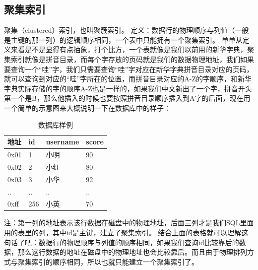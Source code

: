 \documentclass[UTF8]{ctexart}
\begin{document}
\subsection{聚集索引}
聚集（clustered）索引，也叫聚簇索引。
定义：数据行的物理顺序与列值（一般是主键的那一列）的逻辑顺序相同，一个表中只能拥有一个聚集索引。
单单从定义来看是不是显得有点抽象，打个比方，一个表就像是我们以前用的新华字典，聚集索引就像是拼音目录，而每个字存放的页码就是我们的数据物理地址，我们如果要查询一个“哇”字，我们只需要查询“哇”字对应在新华字典拼音目录对应的页码，就可以查询到对应的“哇”字所在的位置，而拼音目录对应的A-Z的字顺序，和新华字典实际存储的字的顺序A-Z也是一样的，如果我们中文新出了一个字，拼音开头第一个是B，那么他插入的时候也要按照拼音目录顺序插入到A字的后面，现在用一个简单的示意图来大概说明一下在数据库中的样子：
\begin{table}[]
    \caption{数据库样例}
    \vspace{20pt}
    \centering
    \begin{tabular}{p{2cm}p{3cm}p{2.5cm}p{2.5cm}}
        \hline
        地址 & id  & username & score\\
        \hline
        0x01&	1	&小明	&90\\
		0x02	&2	&小红&	80\\
		0x03&	3	&小华&	92\\
		..	&..	&..	&..\\
		0xff&	256	&小英&	70\\
        \hline       
    \end{tabular}
    \label{bs2}
\end{table}
注：第一列的地址表示该行数据在磁盘中的物理地址，后面三列才是我们SQL里面用的表里的列，其中id是主键，建立了聚集索引。
结合上面的表格就可以理解这句话了吧：数据行的物理顺序与列值的顺序相同，如果我们查询id比较靠后的数据，那么这行数据的地址在磁盘中的物理地址也会比较靠后。而且由于物理排列方式与聚集索引的顺序相同，所以也就只能建立一个聚集索引了。
\end{document}

